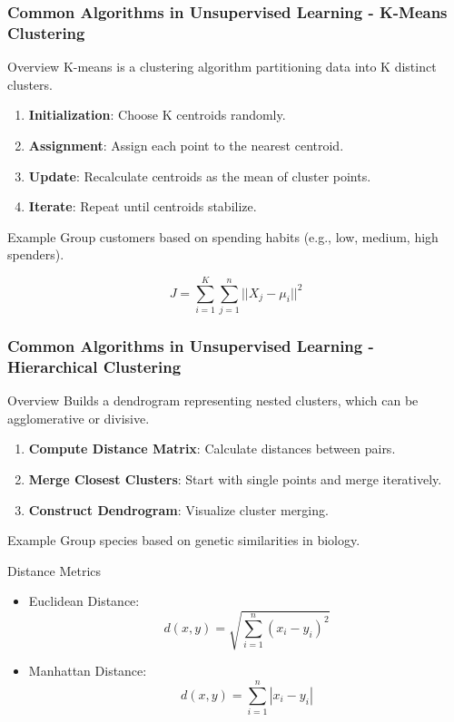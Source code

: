 \documentclass[aspectratio=169]{beamer}
\begin{document}
\begin{frame}[fragile]
    \frametitle{Common Algorithms in Unsupervised Learning - K-Means Clustering}
    \begin{block}{Overview}
        K-means is a clustering algorithm partitioning data into K distinct clusters.
    \end{block}
    
    \begin{enumerate}
        \item \textbf{Initialization}: Choose K centroids randomly.
        \item \textbf{Assignment}: Assign each point to the nearest centroid.
        \item \textbf{Update}: Recalculate centroids as the mean of cluster points.
        \item \textbf{Iterate}: Repeat until centroids stabilize.
    \end{enumerate}
    
    \begin{block}{Example}
        Group customers based on spending habits (e.g., low, medium, high spenders).
    \end{block}
    
    \begin{equation}
        J = \sum_{i=1}^{K} \sum_{j=1}^{n} ||X_j - \mu_i||^2 
    \end{equation}
\end{frame}

\begin{frame}[fragile]
    \frametitle{Common Algorithms in Unsupervised Learning - Hierarchical Clustering}
    \begin{block}{Overview}
        Builds a dendrogram representing nested clusters, which can be agglomerative or divisive.
    \end{block}

    \begin{enumerate}
        \item \textbf{Compute Distance Matrix}: Calculate distances between pairs.
        \item \textbf{Merge Closest Clusters}: Start with single points and merge iteratively.
        \item \textbf{Construct Dendrogram}: Visualize cluster merging.
    \end{enumerate}

    \begin{block}{Example}
        Group species based on genetic similarities in biology.
    \end{block}
    
    \begin{block}{Distance Metrics}
        \begin{itemize}
            \item Euclidean Distance: 
            \[ d(x, y) = \sqrt{\sum_{i=1}^n (x_i - y_i)^2} \]
            \item Manhattan Distance: 
            \[ d(x, y) = \sum_{i=1}^n |x_i - y_i| \]
        \end{itemize}
    \end{block}
\end{frame}
\end{document}
